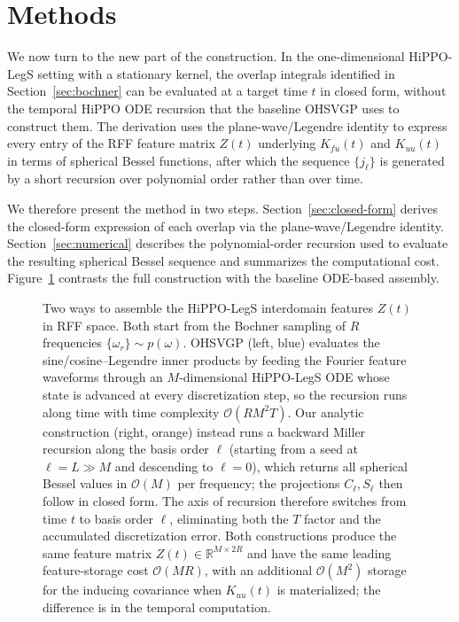 \documentclass{article}
\theoremstyle{plain}
\theoremstyle{definition}
\theoremstyle{remark}
\begin{document}
\section{Methods}

We now turn to the new part of the construction. In the one-dimensional HiPPO-LegS setting with a stationary kernel, the overlap integrals identified in Section~\ref{sec:bochner} can be evaluated at a target time $t$ in closed form, without the temporal HiPPO ODE recursion that the baseline OHSVGP uses to construct them. The derivation uses the plane-wave/Legendre identity to express every entry of the RFF feature matrix $Z(t)$ underlying $K_{fu}(t)$ and $K_{uu}(t)$ in terms of spherical Bessel functions, after which the sequence $\{j_\ell\}$ is generated by a short recursion over polynomial order rather than over time.

We therefore present the method in two steps. Section~\ref{sec:closed-form} derives the closed-form expression of each overlap via the plane-wave/Legendre identity. Section~\ref{sec:numerical} describes the polynomial-order recursion used to evaluate the resulting spherical Bessel sequence and summarizes the computational cost. Figure~\ref{fig:overview} contrasts the full construction with the baseline ODE-based assembly.

\begin{figure}[!t]
  \centering
  
  \caption{%
    Two ways to assemble the HiPPO-LegS interdomain features $Z(t)$ in RFF space.
    Both start from the Bochner sampling of $R$ frequencies
    $\{\omega_r\} \sim p(\omega)$.
    OHSVGP (left, blue) evaluates the sine/cosine--Legendre inner
    products by feeding the Fourier feature waveforms through an
    $M$-dimensional HiPPO-LegS ODE whose state is advanced at every
    discretization step, so the recursion runs along time with
    time complexity $\mathcal{O}(R M^2 T)$.
    Our analytic construction (right, orange) instead runs a
    backward Miller recursion along the basis order $\ell$
    (starting from a seed at $\ell = L \gg M$ and descending to
    $\ell = 0$), which returns all spherical Bessel values in
    $\mathcal{O}(M)$ per frequency; the projections $C_\ell, S_\ell$
    then follow in closed form.
    The axis of recursion therefore switches from time $t$ to basis
    order $\ell$, eliminating both the $T$ factor and the accumulated
    discretization error.
    Both constructions produce the same feature matrix $Z(t) \in \mathbb{R}^{M \times 2R}$ and have the same leading feature-storage cost $\mathcal{O}(MR)$, with an additional $\mathcal{O}(M^2)$ storage for the inducing covariance when $K_{uu}(t)$ is materialized; the difference is in the temporal computation.
  }
  \label{fig:overview}
\end{figure}
\end{document}
